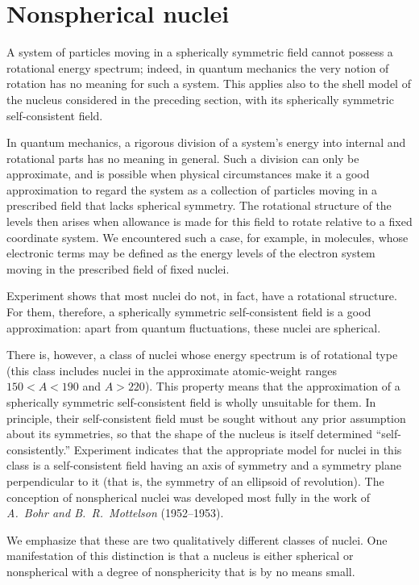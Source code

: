\section{Nonspherical nuclei}

A system of particles moving in a spherically symmetric field cannot possess a
rotational energy spectrum; indeed, in quantum mechanics the very notion of
rotation has no meaning for such a system. This applies also to the shell model
of the nucleus considered in the preceding section, with its spherically
symmetric self-consistent field.

In quantum mechanics, a rigorous division of a system's energy into internal
and rotational parts has no meaning in general. Such a division can only be
approximate, and is possible when physical circumstances make it a good
approximation to regard the system as a collection of particles moving in a
prescribed field that lacks spherical symmetry. The rotational structure of
the levels then arises when allowance is made for this field to rotate relative
to a fixed coordinate system. We encountered such a case, for example, in
molecules, whose electronic terms may be defined as the energy levels of the
electron system moving in the prescribed field of fixed nuclei.

Experiment shows that most nuclei do not, in fact, have a rotational
structure. For them, therefore, a spherically symmetric self-consistent field
is a good approximation: apart from quantum fluctuations, these nuclei are
spherical.

There is, however, a class of nuclei whose energy spectrum is of rotational
type (this class includes nuclei in the approximate atomic-weight ranges
$150<A<190$ and $A>220$). This property means that the approximation of a
spherically symmetric self-consistent field is wholly unsuitable for them. In
principle, their self-consistent field must be sought without any prior
assumption about its symmetries, so that the shape of the nucleus is itself
determined ``self-consistently.'' Experiment indicates that the appropriate
model for nuclei in this class is a self-consistent field having an axis of
symmetry and a symmetry plane perpendicular to it (that is, the symmetry of an
ellipsoid of revolution). The conception of nonspherical nuclei was developed
most fully in the work of \emph{A.~Bohr and B.~R.~Mottelson} (1952--1953).

We emphasize that these are two qualitatively different classes of nuclei.
One manifestation of this distinction is that a nucleus is either spherical
or nonspherical with a degree of nonsphericity that is by no means small.


